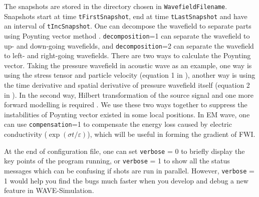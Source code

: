 \documentclass[pdftex,a4paper,parskip,listof=totoc,bibliography=totoc,onehalfspacing,12pt]{scrreprt}
\begin{document}
The snapshots are stored in the directory chosen in \verb+WavefieldFilename+. Snapshots start at time \verb+tFirstSnapshot+, end at time \verb+tLastSnapshot+ and have an interval of \verb+tIncSnapshot+. One can decompose the wavefield to separate parts using Poynting vector method \citep{yoon2006reverse,yan2013improving}. \verb+decomposition+=1 can separate the wavefield to up- and down-going wavefields, and \verb+decomposition+=2 can separate the wavefield to left- and right-going wavefields. There are two ways to calculate the Poynting vector. Taking the pressure wavefield in acoustic wave as an example, one way is using the stress tensor and particle velocity (equation 1 in  \cite{yan2013improving}), another way is using the time derivative and spatial derivative of pressure wavefield itself (equation 2 in  \cite{yan2013improving}). In the second way, Hilbert transformation of the source signal and one more forward modelling is required  \citep{wang2016up}. We use these two ways together to suppress the instabilities of Poynting vector existed in some local positions. In EM wave, one can use \verb+compensation+=1 to compensate the energy loss caused by electric conductivity ($\exp(\sigma t/\varepsilon)$), which will be useful in forming the gradient of FWI.

At the end of configuration file, one can set \verb+verbose+ = 0 to briefly display the key points of the program running, or \verb+verbose+ = 1 to show all the status messages which can be confusing if shots are run in parallel. However, \verb+verbose+ = 1 would help you find the bugs much faster when you develop and debug a new feature in WAVE-Simulation.
\end{document}
